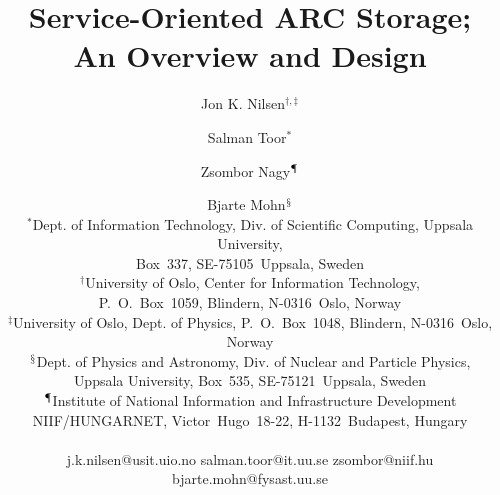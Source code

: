 \documentclass[final]{ieee}
\begin{document}
\pagestyle{headings} 
\title{Service-Oriented ARC Storage; \\An Overview and Design}
\author{  Jon K. Nilsen$^{\dagger,\ddagger}$ \and Salman Toor$^{*}$
  \and Zsombor Nagy$^{\mathparagraph}$ \and Bjarte Mohn$^{\mathsection}$ 
\\$^{*}$Dept. of Information Technology, Div. of Scientific Computing, Uppsala
University,\\ Box~337, SE-75105~Uppsala, Sweden
 \\ $^{\dagger}$University of Oslo, Center for Information Technology,\\
P.~O.~Box~1059, Blindern, N-0316~Oslo, Norway
  \\ $^{\ddagger}$University of Oslo, Dept. of Physics, P.~O.~Box~1048,
Blindern, N-0316~Oslo, Norway
  \\  $^{\mathsection}$Dept. of Physics and Astronomy, Div. of Nuclear and
Particle Physics,\\ Uppsala University, Box~535, SE-75121~Uppsala, Sweden \\
$^{\mathparagraph}$Institute of National Information and Infrastructure
Development\\ NIIF/HUNGARNET, Victor~Hugo~18-22, H-1132~Budapest, Hungary\\ \\ 
j.k.nilsen@usit.uio.no \hspace{5 mm}
  salman.toor@it.uu.se \hspace{5 mm} zsombor@niif.hu \\  \hspace{7 mm}
  bjarte.mohn@fysast.uu.se}
  
\end{document}
